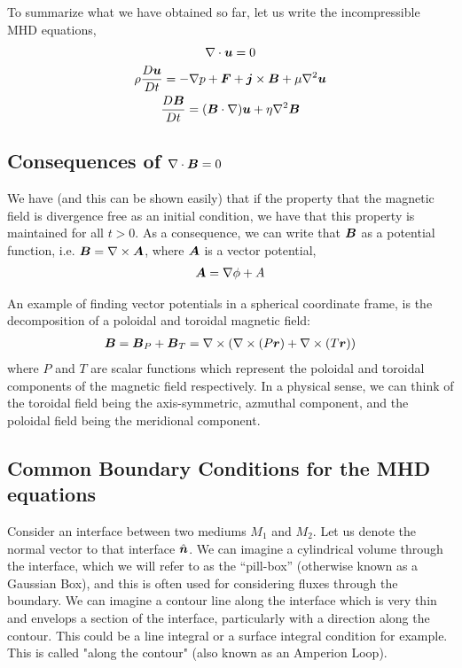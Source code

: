 \documentclass{article}
\begin{document}
To summarize what we have obtained so far, let us write the incompressible MHD
equations,
\begin{gather}
    \nabla \cdot{\boldsymbol{u}} = 0\\
    \rho\frac{D \boldsymbol{u}}{D t} = -\nabla p + \boldsymbol{F} + \boldsymbol{j}\times\boldsymbol{B} + \mu\nabla^2\boldsymbol{u}\\
    \frac{D \boldsymbol{B}}{D t} = (\boldsymbol{B}\cdot\nabla)\boldsymbol{u} + \eta\nabla^2\boldsymbol{B}
\end{gather}


\subsection{Consequences of $\nabla \cdot{\boldsymbol{B}} = 0$}

We have (and this can be shown easily) that if the property that the magnetic
field is divergence free as an initial condition, we have that this property is
maintained for all $t>0$. As a consequence, we can write that $\boldsymbol{B}$ as a
potential function, i.e. $\boldsymbol{B} = \nabla\times\boldsymbol{A}$, where $\boldsymbol{A}$ is a vector
potential, 
\begin{gather*}
    \boldsymbol{A} = \nabla\phi + A
\end{gather*}

An example of finding vector potentials in a spherical coordinate frame, is the
decomposition of a poloidal and toroidal magnetic field:
\begin{gather*}
    \boldsymbol{B} = \boldsymbol{B}_P + \boldsymbol{B}_T =\nabla\times\left(\nabla\times(P\boldsymbol{r}) +
    \nabla\times(T\boldsymbol{r})\right)
\end{gather*}
where $P$ and $T$ are scalar functions which represent the poloidal and toroidal
components of the magnetic field respectively. In a physical sense, we can think
of the toroidal field being the axis-symmetric, azmuthal component, and the
poloidal field being the meridional component. 

\subsection{Common Boundary Conditions for the MHD equations}

Consider an interface between two mediums $M_1$ and $M_2$. Let us denote the
normal vector to that interface $\hat{\boldsymbol{n}}$. We can imagine a cylindrical
volume through the interface, which we will refer to as the ``pill-box''
(otherwise known as a Gaussian Box), and
this is often used for considering fluxes through the boundary. We can imagine
a contour line along the interface which is very thin and envelops a section of
the interface, particularly with a direction along the contour. This could be a
line integral or a surface integral condition for example. This is called "along
the contour" (also known as an Amperion Loop). 
\end{document}
